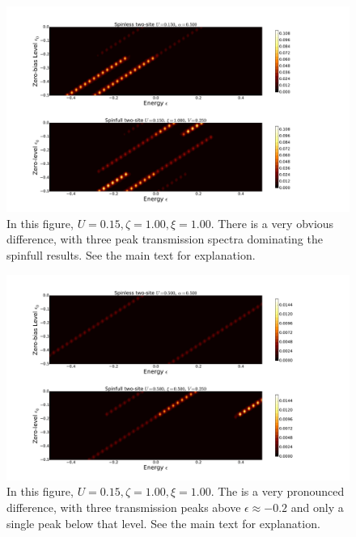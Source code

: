 \begin{figure}[!bt]
    \centering
    \includegraphics[height=.38\textheight]{pdf/map/transmap_u2_k2.pdf}
    \caption{In this figure, $U=0.15, \zeta=1.00, \xi=1.00$. There is a very obvious difference, with three peak transmission spectra dominating the spinfull results. See the main text for explanation.}
    \label{fig:transmap22}
\end{figure}
\begin{figure}[!bt]
    \centering
    \includegraphics[height=.38\textheight]{pdf/map/transmap_u3_k3.pdf}
    \caption{In this figure, $U=0.15, \zeta=1.00, \xi=1.00$. The is a very pronounced difference, with three transmission peaks above $\epsilon\approx -0.2$ and only a single peak below that level.  See the main text for explanation.}
    \label{fig:transmap33}
\end{figure}
